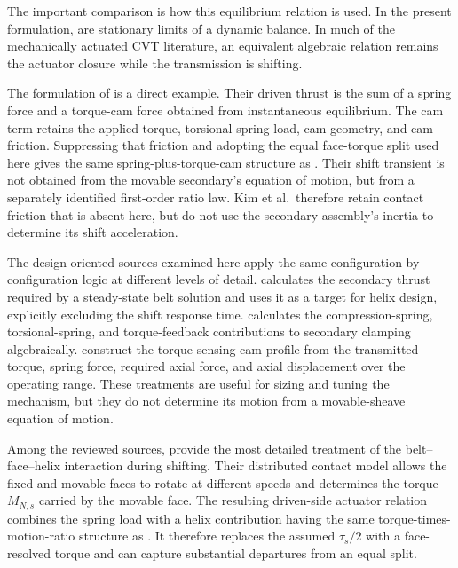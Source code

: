 \documentclass[11pt]{report}
\numberwithin{equation}{section}
\begin{document}
The important comparison is how this equilibrium relation is used. In the
present formulation,
are stationary limits of a dynamic balance. In much of the mechanically
actuated CVT literature, an equivalent algebraic relation remains the
actuator closure while the transmission is shifting.

The formulation of \citet{KimEtAl2002} is a direct example. Their driven
thrust is the sum of a spring force and a torque-cam force obtained from
instantaneous equilibrium. The cam term retains the applied torque,
torsional-spring load, cam geometry, and cam friction. Suppressing that
friction and adopting the equal face-torque split used here gives the same
spring-plus-torque-cam structure as
. Their shift transient is not
obtained from the movable secondary's equation of motion, but from a
separately identified first-order ratio law. Kim et al.\ therefore retain
contact friction that is absent here, but do not use the secondary assembly's
inertia to determine its shift acceleration.

The design-oriented sources examined here apply the same
configuration-by-configuration logic at different levels of detail.
\citet{Messick2018} calculates the secondary thrust required by a steady-state
belt solution and uses it as a target for helix design, explicitly excluding
the shift response time. \citet{Skinner2020} calculates the compression-spring,
torsional-spring, and torque-feedback contributions to secondary clamping
algebraically. \citet{ArangoMunoz2020} construct the torque-sensing cam profile
from the transmitted torque, spring force, required axial force, and axial
displacement over the operating range. These treatments are useful for sizing
and tuning the mechanism, but they do not determine its motion from a
movable-sheave equation of motion.

Among the reviewed sources, \citet{SorgeCammalleri2011} provide the most
detailed treatment of the belt--face--helix interaction during shifting. Their
distributed contact model allows the fixed and movable faces to rotate at
different speeds and determines the torque \(M_{N,s}\) carried by the movable
face. The resulting driven-side actuator relation combines the spring load
with a helix contribution having the same torque-times-motion-ratio structure
as . It therefore replaces the
assumed \(\tau_s/2\) with a face-resolved torque and can capture substantial
departures from an equal split.
\end{document}
